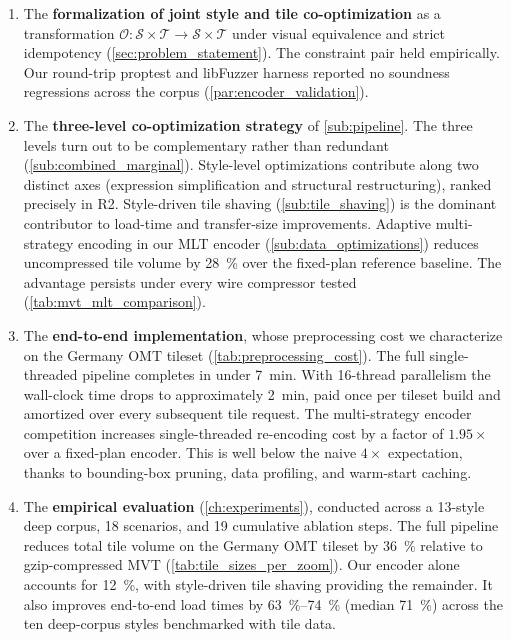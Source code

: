 \begin{enumerate}[label=\textbf{C\arabic*}]
    \item The \textbf{formalization of joint style and tile co-optimization} as a transformation $\mathcal{O}: \mathcal{S} \times \mathcal{T} \to \mathcal{S} \times \mathcal{T}$ under visual equivalence and strict idempotency (\cref{sec:problem_statement}).
    The constraint pair held empirically.
    Our round-trip proptest and libFuzzer harness reported no soundness regressions across the corpus (\cref{par:encoder_validation}).

    \item The \textbf{three-level co-optimization strategy} of \cref{sub:pipeline}.
    The three levels turn out to be complementary rather than redundant (\cref{sub:combined_marginal}).
    Style-level optimizations contribute along two distinct axes (expression simplification and structural restructuring), ranked precisely in R2.
    Style-driven tile shaving (\cref{sub:tile_shaving}) is the dominant contributor to load-time and transfer-size improvements.
    Adaptive multi-strategy encoding in our \ac{MLT} encoder (\cref{sub:data_optimizations}) reduces uncompressed tile volume by \qty{28}{\percent} over the fixed-plan reference baseline.
    The advantage persists under every wire compressor tested (\cref{tab:mvt_mlt_comparison}).

    \item The \textbf{end-to-end implementation}, whose preprocessing cost we characterize on the Germany \ac{OMT} tileset (\cref{tab:preprocessing_cost}).
    The full single-threaded pipeline completes in under \qty{7}{\minute}.
    With 16-thread parallelism the wall-clock time drops to approximately \qty{2}{\minute}, paid once per tileset build and amortized over every subsequent tile request.
    The multi-strategy encoder competition increases single-threaded re-encoding cost by a factor of $1.95\times$ over a fixed-plan encoder.
    This is well below the naive $4\times$ expectation, thanks to bounding-box pruning, data profiling, and warm-start caching.

    \item The \textbf{empirical evaluation} (\cref{ch:experiments}), conducted across a 13-style deep corpus, 18 scenarios, and 19 cumulative ablation steps.
    The full pipeline reduces total tile volume on the Germany \ac{OMT} tileset by \qty{36}{\percent} relative to gzip-compressed \ac{MVT} (\cref{tab:tile_sizes_per_zoom}).
    Our encoder alone accounts for \qty{12}{\percent}, with style-driven tile shaving providing the remainder.
    It also improves end-to-end load times by \qtyrange{63}{74}{\percent} (median \qty{71}{\percent}) across the ten deep-corpus styles benchmarked with tile data.
\end{enumerate}

